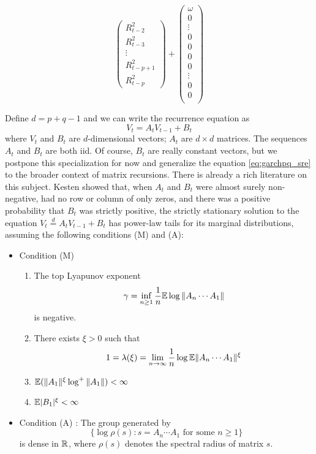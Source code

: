 \documentclass[aoas,preprint]{imsart}
\numberwithin{equation}{section}
\theoremstyle{plain}
\begin{document}
\begin{tiny}
\begin{equation*}
\begin{pmatrix}
        R_{t-2}^2 \\
        R_{t-3}^2 \\
        \vdots \\
        R_{t-p+1}^2 \\
        R_{t-p}^2
      \end{pmatrix}
      +
      \begin{pmatrix}
        \omega \\
        0 \\
        \vdots \\
        0 \\
        0 \\
        0 \\
        0 \\
        \vdots \\
        0 \\
        0 \\
      \end{pmatrix}
  \end{equation*}
\end{tiny}
Define $d = p + q - 1$ and we can write the recurrence equation as
\begin{equation}
  \label{eq:garchpq_sre}
  V_t = A_t V_{t-1} + B_t
\end{equation}
where $V_t$ and $B_t$ are $d$-dimensional vectors; $A_t$ are
$d \times d$ matrices. The sequences $A_t$ and $B_t$ are both iid.
Of course, $B_t$ are really constant vectors,
but we postpone this specialization for now and generalize the
equation \eqref{eq:garchpq_sre} to the broader context of matrix
recursions.
There is already a rich literature on this subject. Kesten
\cite{kesten:1973} showed that, when $A_t$ and $B_t$ were almost
surely non-negative, had no row or column of only zeros, and there was
a positive probability that $B_t$ was strictly positive, the strictly
stationary solution to the equation
$V_t \overset{d}{=} A_t V_{t-1} + B_t$ has power-law tails
for its marginal distributions, assuming the following conditions (M)
and (A):
\begin{itemize}
\item Condition (M)
  \begin{enumerate}
  \item The top Lyapunov exponent
    \[
    \gamma = \inf_{n \geq 1} {1 \over n}\mathbb{E} \log \|A_n \cdots A_1\|
    \]
    is negative.
  \item There exists $\xi > 0$ such that
    \[
    1 = \lambda(\xi) = \lim_{n \to \infty} {1 \over n} \log \mathbb{E} \|A_n \cdots A_1\|^\xi
    \]
  \item $\mathbb{E} (\|A_1\|^\xi \log^+\|A_1\|) < \infty$
  \item $\mathbb{E} |B_1|^\xi < \infty$
  \end{enumerate}
\item Condition (A) : The group generated by
  \[
  \{\log\rho(s): s = A_n \cdots A_1 \text{ for some } n \geq 1\}
  \]
  is dense in $\mathbb R$, where $\rho(s)$ denotes the spectral
  radius of matrix $s$.
\end{itemize}
\end{document}
